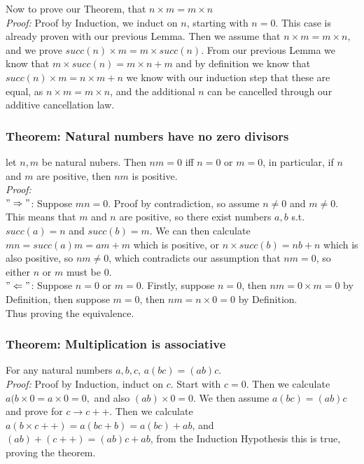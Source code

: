 Now to prove our Theorem, that $n\times m = m\times n$\\
\textit{Proof:} Proof by Induction, we induct on $n$, starting with $n=0$. This case is already proven with our previous Lemma. Then we assume that $n\times m = m \times n$, and we prove $succ(n)\times m = m\times succ(n)$. From our previous Lemma we know that $m \times succ(n) = m\times n + m$ and by definition we know that $succ(n) \times m = n\times m + n$ we know with our induction step that these are equal, as $n\times m = m\times n$, and the additional $n$ can be cancelled through our additive cancellation law.

\subsubsection*{Theorem: Natural numbers have no zero divisors}
let $n,m$ be natural nubers. Then $nm=0$ iff $n=0$ or $m=0$, in particular, if $n$ and $m$ are positive, then $nm$ is positive.\\
\textit{Proof:}\\
$"\Rightarrow"$: Suppose $mn = 0$. Proof by contradiction, so assume $n\neq0$ and $m\neq0$. This means that $m$ and $n$ are positive, so there exist numbers $a,b$ s.t. $succ(a) = n$ and $succ(b) = m$. We can then calculate $mn = succ(a)m = am + m$ which is positive, or $n\times succ(b) = nb + n$ which is also positive, so $nm \neq 0$, which contradicts our assumption that $nm = 0$, so either $n$ or $m$ must be 0.\\
$"\Leftarrow"$: Suppose $n = 0$ or $m = 0$. Firstly, suppose $n = 0$, then $nm = 0\times m = 0$ by Definition, then suppose $m = 0$, then $nm = n \times 0 = 0$ by Definition.\\
Thus proving the equivalence.

\subsubsection*{Theorem: Multiplication is associative}
For any natural numbers $a,b,c$, $a(bc) = (ab)c$.\\
\textit{Proof:} Proof by Induction, induct on $c$. Start with $c=0$. Then we calculate $a(b\times 0 = a\times 0 = 0,$ and also $(ab)\times 0 = 0$. We then assume $a(bc) = (ab)c$ and prove for $c\rightarrow c++$. Then we calculate $a(b\times c++) = a(bc + b) = a(bc) + ab$, and $(ab) + (c++) = (ab)c + ab$, from the Induction Hypothesis this is true, proving the theorem.



